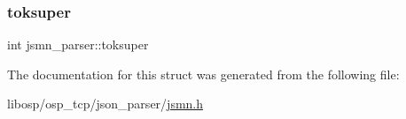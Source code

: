 \mbox{\label{structjsmn__parser_af11fcec48d9f1298909777a12f1d1e39}} 
\subsubsection{\texorpdfstring{toksuper}{toksuper}}
{\footnotesize\ttfamily int jsmn\+\_\+parser\+::toksuper}



The documentation for this struct was generated from the following file\+:\begin{DoxyCompactItemize}
\item 
libosp/osp\+\_\+tcp/json\+\_\+parser/\mbox{\hyperlink{jsmn_8h}{jsmn.\+h}}\end{DoxyCompactItemize}
